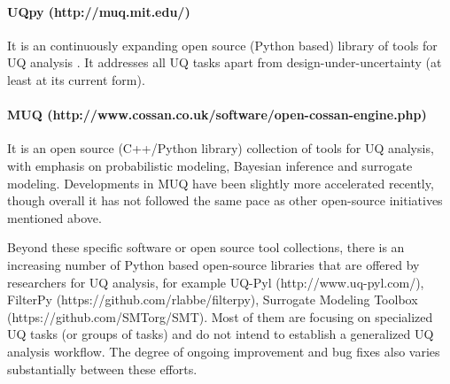 \paragraph{UQpy (http://muq.mit.edu/)} It is an continuously expanding open source (Python based) library of tools for UQ analysis \citep{olivier2020uqpy}. It addresses all UQ tasks apart from design-under-uncertainty (at least at its current form).

\paragraph{MUQ (http://www.cossan.co.uk/software/open-cossan-engine.php)} It is an open source (C++/Python library) collection of tools for UQ analysis, with emphasis on probabilistic modeling, Bayesian inference and surrogate modeling. Developments in MUQ have been slightly more accelerated recently, though overall it has not followed the same pace as other open-source initiatives mentioned above.

Beyond these specific software or open source tool collections, there is an increasing number of Python based open-source libraries that are offered by researchers for UQ analysis, for example UQ-Pyl (http://www.uq-pyl.com/), FilterPy (https://github.com/rlabbe/filterpy), Surrogate Modeling Toolbox (https://github.com/SMTorg/SMT). Most of them are focusing on specialized UQ tasks (or groups of tasks) and do not intend to establish a generalized UQ analysis workflow. The degree of ongoing improvement and bug fixes also varies substantially between these efforts. 

